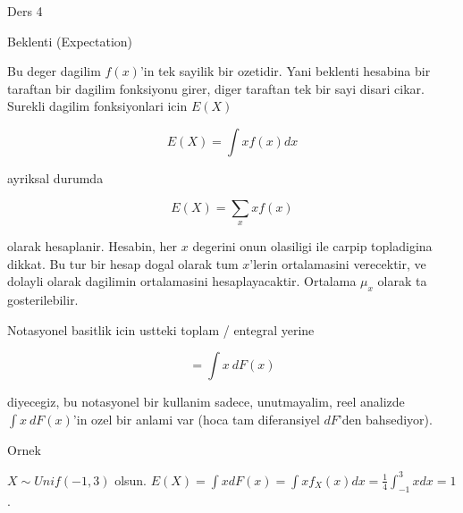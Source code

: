 \documentclass[12pt,fleqn]{article}\usepackage{../common}
\begin{document}
Ders 4

Beklenti (Expectation) 

Bu deger dagilim $f(x)$'in tek sayilik bir ozetidir. Yani beklenti hesabina
bir taraftan bir dagilim fonksiyonu girer, diger taraftan tek bir sayi
disari cikar. Surekli dagilim fonksiyonlari icin $E(X)$

\[  E(X) = \int x f(x) dx\]

ayriksal durumda

\[ E(X) = \sum_x xf(x) \]

olarak hesaplanir. Hesabin, her $x$ degerini onun olasiligi ile carpip
topladigina dikkat. Bu tur bir hesap dogal olarak tum $x$'lerin
ortalamasini verecektir, ve dolayli olarak dagilimin ortalamasini
hesaplayacaktir. Ortalama $\mu_x$ olarak ta gosterilebilir.

Notasyonel basitlik icin ustteki toplam / entegral yerine 

\[ = \int x \ dF(x) \]

diyecegiz, bu notasyonel bir kullanim sadece, unutmayalim, reel analizde
$\int x \ dF(x)$'in ozel bir anlami var (hoca tam diferansiyel $dF$'den
bahsediyor). 

Ornek 

$X \sim Unif(-1,3)$ olsun. $E(X) = \int xdF(x) = \int x f_X(x)dx = \frac{
  1}{4} \int _{ -1}^{3} x dx = 1$. 
\end{document}
